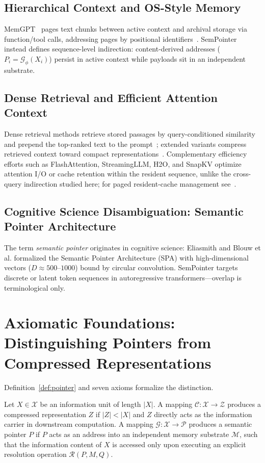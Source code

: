 \documentclass[runningheads]{llncs}
\begin{document}
\subsection{Hierarchical Context and OS-Style Memory}
MemGPT~\cite{packer2023memgpt} pages text chunks between active context and archival storage via function/tool calls, addressing pages by positional identifiers~\cite{packer2023memgpt}. SemPointer instead defines sequence-level indirection: content-derived addresses ($P_i = \mathcal{G}_\phi(X_i)$) persist in active context while payloads sit in an independent substrate.

\subsection{Dense Retrieval and Efficient Attention Context}
Dense retrieval methods retrieve stored passages by query-conditioned similarity and prepend the top-ranked text to the prompt~\cite{lewis2020rag}; extended variants compress retrieved context toward compact representations~\cite{cheng2024xrag}. Complementary efficiency efforts such as FlashAttention, StreamingLLM, H2O, and SnapKV optimize attention I/O or cache retention within the resident sequence, unlike the cross-query indirection studied here; for paged resident-cache management see~\cite{kwon2023pagedattention}.

\subsection{Cognitive Science Disambiguation: Semantic Pointer Architecture}
The term \textit{semantic pointer} originates in cognitive science: Eliasmith \cite{eliasmith2013mind} and Blouw et al. \cite{blouw2016concepts} formalized the Semantic Pointer Architecture (SPA) with high-dimensional vectors ($D \approx 500$--$1000$) bound by circular convolution. SemPointer targets discrete or latent token sequences in autoregressive transformers---overlap is terminological only.

\section{Axiomatic Foundations: Distinguishing Pointers from Compressed Representations}

Definition~\ref{def:pointer} and seven axioms formalize the distinction.

\begin{definition}\label{def:pointer}
Let $X \in \mathcal{X}$ be an information unit of length $|X|$. A mapping $\mathcal{C}: \mathcal{X} \to \mathcal{Z}$ produces a compressed representation $Z$ if $|Z| < |X|$ and $Z$ directly acts as the information carrier in downstream computation. A mapping $\mathcal{G}: \mathcal{X} \to \mathcal{P}$ produces a semantic pointer $P$ if $P$ acts as an address into an independent memory substrate $\mathcal{M}$, such that the information content of $X$ is accessed only upon executing an explicit resolution operation $\mathcal{R}(P, M, Q)$.
\end{definition}
\end{document}
